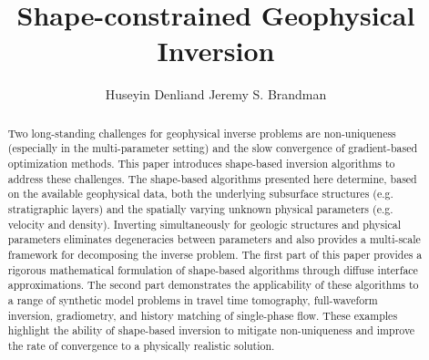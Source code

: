 \documentclass[manuscript,revised]{geophysics}
\begin{document}
\title{Shape-constrained Geophysical Inversion}

\renewcommand{\thefootnote}{\fnsymbol{footnote}} 

\address{
\footnotemark[1] ExxonMobil Research \& Engineering Company, \\
1545 Route 22 East, Annandale, NJ 08801 \\
\footnotemark[2] DCS Corporation, \\
6909 Metro Park Drive, Alexandria, VA 22310}
\author{Huseyin Denli\footnotemark[1] and Jeremy S. Brandman\footnotemark[2]}

\maketitle

\begin{abstract}
Two long-standing challenges for geophysical inverse problems are non-uniqueness (especially in the multi-parameter setting) and the slow convergence of gradient-based optimization methods.  This paper introduces shape-based inversion algorithms to address these challenges.  The shape-based algorithms presented here determine, based on the available geophysical data, both the underlying subsurface structures (e.g. stratigraphic layers) and the spatially varying unknown physical parameters (e.g. velocity and density).  Inverting simultaneously for geologic structures and physical parameters eliminates degeneracies between parameters and also provides a multi-scale framework for decomposing the inverse problem.  The first part of this paper provides a rigorous mathematical formulation of shape-based algorithms through diffuse interface approximations.  The second part demonstrates the applicability of these algorithms to a range of synthetic model problems in travel time tomography, full-waveform inversion, gradiometry, and history matching of single-phase flow.  These examples highlight the ability of shape-based inversion to mitigate non-uniqueness and improve the rate of convergence to a physically realistic solution.    
\end{abstract}
\end{document}
